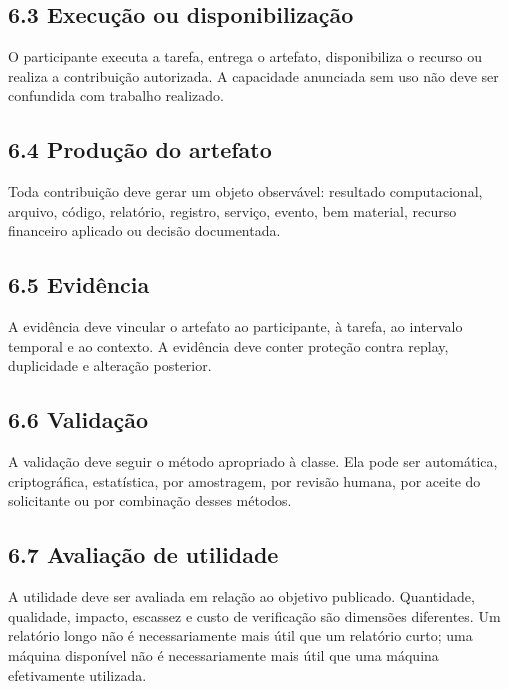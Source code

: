 \documentclass[12pt,a4paper]{article}
\begin{document}
\subsection{6.3 Execução ou disponibilização}

O participante executa a tarefa, entrega o artefato, disponibiliza o recurso ou realiza a contribuição autorizada. A capacidade anunciada sem uso não deve ser confundida com trabalho realizado.\\

\subsection{6.4 Produção do artefato}

Toda contribuição deve gerar um objeto observável: resultado computacional, arquivo, código, relatório, registro, serviço, evento, bem material, recurso financeiro aplicado ou decisão documentada.\\

\subsection{6.5 Evidência}

A evidência deve vincular o artefato ao participante, à tarefa, ao intervalo temporal e ao contexto. A evidência deve conter proteção contra replay, duplicidade e alteração posterior.\\

\subsection{6.6 Validação}

A validação deve seguir o método apropriado à classe. Ela pode ser automática, criptográfica, estatística, por amostragem, por revisão humana, por aceite do solicitante ou por combinação desses métodos.\\

\subsection{6.7 Avaliação de utilidade}

A utilidade deve ser avaliada em relação ao objetivo publicado. Quantidade, qualidade, impacto, escassez e custo de verificação são dimensões diferentes. Um relatório longo não é necessariamente mais útil que um relatório curto; uma máquina disponível não é necessariamente mais útil que uma máquina efetivamente utilizada.\\
\end{document}
